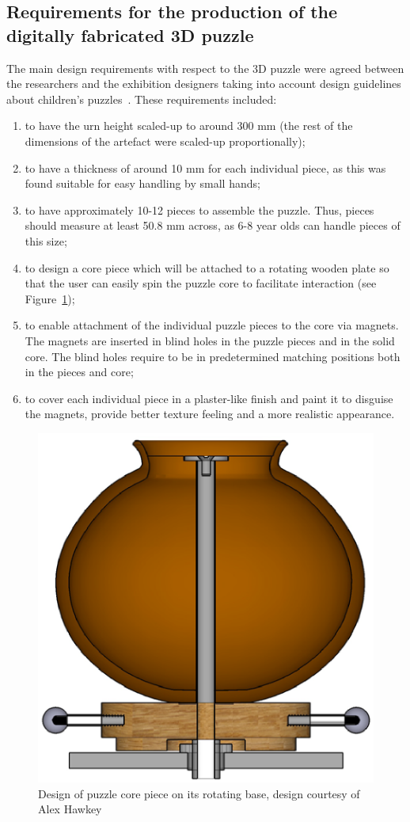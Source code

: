 \documentclass[acmlarge,screen,dvipsnames]{acmart}
\begin{document}
\subsection{Requirements for the production of the digitally fabricated 3D puzzle}

The main design requirements with respect to the 3D puzzle were agreed
between the researchers and the exhibition designers taking into
account design guidelines about children's
puzzles~\cite{Smith2002}. These requirements included:
%
\begin{enumerate}
\item to have the urn height scaled-up to around 300 mm (the rest of
  the dimensions of the artefact were scaled-up proportionally);
\item to have a thickness of around 10 mm for each individual piece,
  as this was found suitable for easy handling by small hands;
\item to have approximately 10-12 pieces to assemble the puzzle. Thus,
  pieces should measure at least 50.8 mm across, as 6-8 year olds can
  handle pieces of this size;
\item to design a core piece which will be attached to a rotating
  wooden plate so that the user can easily spin the puzzle core to
  facilitate interaction (see Figure~\ref{fig:alexdesign});
\item to enable attachment of the individual puzzle pieces to the core
  via magnets. The magnets are inserted in blind holes in the puzzle
  pieces and in the solid core. The blind holes require to be in
  predetermined matching positions both in the pieces and core;
\item to cover each individual piece in a plaster-like finish and
  paint it to disguise the magnets, provide better texture feeling and
  a more realistic appearance.
\end{enumerate} 

\begin{figure}[H]
  \centering
  \includegraphics[width=0.5\linewidth]{images/alexdesign}
  \caption{\label{fig:alexdesign}%
    Design of puzzle core piece on its rotating base, design courtesy of Alex Hawkey}
\end{figure}
\end{document}
